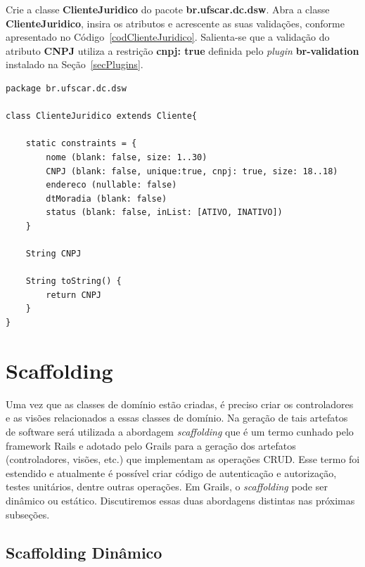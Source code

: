 Crie a  classe {\bf ClienteJuridico}  do pacote {\bf br.ufscar.dc.dsw}.   Abra a
classe  {\bf  ClienteJuridico},  insira   os  atributos  e  acrescente  as  suas
validações,    conforme    apresentado    no    Código~\ref{codClienteJuridico}.
Salienta-se  que a validação  do atributo  {\bf CNPJ}  utiliza a  restrição {\bf
  cnpj:  true}  definida pelo  {\it  plugin}  {\bf  br-validation} instalado  na
Seção~\ref{secPlugins}. 

\begin{lstlisting}[caption=Classe  de  domínio  {\bf ClienteJuridico},  frame  =
    trBL, float=htbp, label=codClienteJuridico] 
package br.ufscar.dc.dsw

class ClienteJuridico extends Cliente{
    
    static constraints = {
        nome (blank: false, size: 1..30)
        CNPJ (blank: false, unique:true, cnpj: true, size: 18..18)
        endereco (nullable: false)
        dtMoradia (blank: false)
        status (blank: false, inList: [ATIVO, INATIVO])
    }
    
    String CNPJ
    
    String toString() {
        return CNPJ
    }
}
\end{lstlisting}

\newpage

\section{Scaffolding}\label{Scaffolding}

Uma  vez  que  as  classes  de   domínio  estão  criadas,  é  preciso  criar  os
controladores e as  visões relacionados a essas classes  de domínio.  Na geração
de tais artefatos de software será utilizada a abordagem {\it scaffolding} que é
um termo cunhado  pelo framework Rails e adotado pelo Grails  para a geração dos
artefatos (controladores, visões, etc.)  que implementam as operações CRUD. Esse
termo  foi estendido  e atualmente  é possível  criar código  de  autenticação e
autorização,  testes  unitários, dentre  outras  operações.  Em  Grails, o  {\it
  scaffolding}  pode   ser  dinâmico  ou  estático.    Discutiremos  essas  duas
abordagens distintas nas próximas subseções.

\subsection{Scaffolding Dinâmico}

